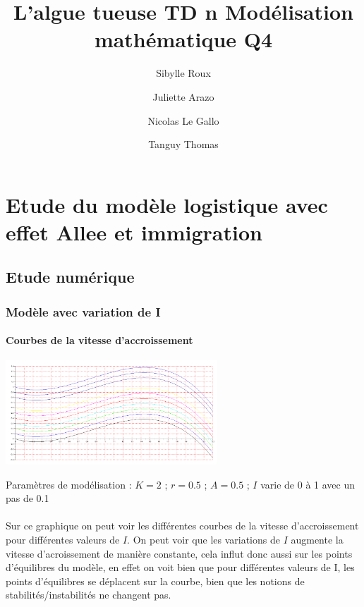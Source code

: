 \documentclass{article}
\begin{document}
\title{L'algue tueuse
	\smallbreak
	TD n
	\smallbreak
	Modélisation mathématique
	\smallbreak
	Q4}
\author{Sibylle Roux \and Juliette Arazo \and Nicolas Le Gallo \and Tanguy Thomas}


\maketitle

\newpage

\tableofcontents

\newpage

\section{Etude du modèle logistique avec effet Allee et immigration}

\subsection{Etude numérique}

\subsubsection{Modèle avec variation de I}

\paragraph{Courbes de la vitesse d'accroissement}
\begin{center}
\includegraphics[width=300px]{img/part1/AlleeI.png}
\end{center}
Paramètres de modélisation : $K=2$  ; $r=0.5$ ; $A=0.5$ ; $I$ varie de 0 à 1 avec un pas de 0.1 
\paragraph{}
Sur ce graphique on peut voir les différentes courbes de la vitesse d'accroissement pour différentes valeurs de $I$. On peut voir que les variations de $I$ augmente la vitesse d'acroissement de manière constante, cela influt donc aussi sur les points d'équilibres du modèle, en effet on voit bien que pour différentes valeurs de I, les points d'équilibres se déplacent sur la courbe, bien que les notions de stabilités/instabilités ne changent pas.
\end{document}
